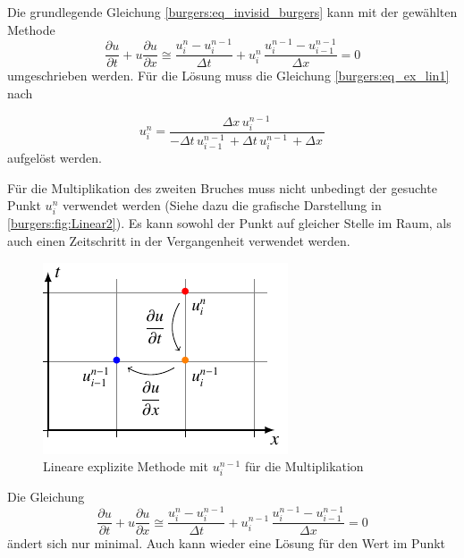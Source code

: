 	Die grundlegende Gleichung \eqref{burgers:eq_invisid_burgers} kann mit der gewählten Methode
	\begin{equation}
	  	\frac {\partial u}{\partial t}+u{\frac {\partial u}{\partial x}} \cong \frac{u_{i}^{n}-u_{i}^{n-1}}{\Delta t}+ u_{i}^{n}\, \frac{u_{i}^{n-1}-u_{i-1}^{n-1}}{\Delta x}=0
	  	  \label{burgers:eq_ex_lin1}
	  	\end{equation}
        umgeschrieben werden.
	  	Für die Lösung muss die Gleichung \eqref{burgers:eq_ex_lin1} nach

	  	\begin{equation}
	  u_{i}^{n} = \frac{\Delta{x}\, u^{n-1}_{i}\,}{- \Delta{t}\, u^{n-1}_{i-1}\, + \Delta{t}\, u^{n-1}_{i}\, + \Delta{x}\,}
		  \label{burgers:eq_ex_sol_lin1}
	\end{equation}
 	aufgelöst werden.

\medskip

	Für die Multiplikation des zweiten Bruches muss nicht unbedingt der gesuchte Punkt $u_{i}^{n}$ verwendet werden (Siehe dazu die grafische Darstellung in \autoref{burgers:fig:Linear2}).
	Es kann sowohl der Punkt auf gleicher Stelle im Raum, als auch einen Zeitschritt in der Vergangenheit verwendet werden.


     \begin{figure}
	\centering
	\includegraphics[height=.4\textwidth]{papers/burgers/BurgersEquation/tikz/linear2/linear2.pdf}
	\caption{Lineare explizite Methode mit  $u_{i}^{n-1}$ f\"ur die Multiplikation}
	\label{burgers:fig:Linear2}
	\end{figure}
	Die Gleichung
	\begin{equation}
			\frac {\partial u}{\partial t}+u{\frac {\partial u}{\partial x}} \cong \frac{u_{i}^{n}-u_{i}^{n-1}}{\Delta t}+ u_{i}^{n-1}\, \frac{u_{i}^{n-1}-u_{i-1}^{n-1}}{\Delta x}=0
		\label{burgers:eq_ex_lin2}
	\end{equation}
	ändert sich nur minimal.
	 Auch kann wieder eine Lösung für den Wert im Punkt

